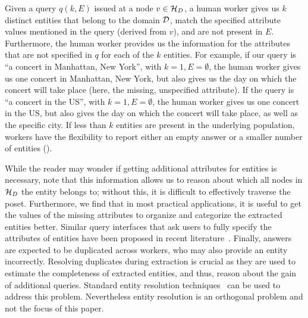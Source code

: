  Given a query $q(k, E)$ issued at a node $v \in \mathcal{H}_D$, a human worker gives us $k$ distinct entities that belong to the domain $\mathcal{D}$, match the specified attribute values mentioned in the query (derived from $v$), and are not present in $E$. Furthermore, the human worker provides us the information for the attributes that are not specified in $q$ for each of the $k$ entities. For example, if our query is ``a concert in Manhattan, New York'', with $k = 1, E = \emptyset$, the human worker gives us one concert in Manhattan, New York, but also gives us the day on which the concert will take place (here, the missing, unspecified attribute). If the query is ``a concert in the US'', with $k = 1, E = \emptyset$, the human worker gives us one concert in the US, but also gives the day on which the concert will take place, as well as the specific city. If less than $k$ entities are present in the underlying population, workers have the flexibility to report either an empty answer or a smaller number of entities ().

While the reader may wonder if getting additional attributes for entities is necessary, note that this information allows us to reason about which all nodes in $\mathcal{H}_D$ the entity belongs to; without this, it is difficult to effectively traverse the poset. Furthermore, we find that in most practical applications, it is useful to get the values of the missing attributes to organize and categorize the extracted entities better. Similar query interfaces that ask users to fully specify the attributes of entities have been proposed in recent literature~\cite{quinn:2014}. \ifpaper Finally, answers are expected to be duplicated across workers, who may also provide an entity incorrectly. Resolving duplicates during extraction is crucial as they are used to estimate the completeness of extracted entities, and thus, reason about the gain of additional queries. Standard entity resolution techniques~\cite{getoor:kdd13} can be used to address this problem. Nevertheless entity resolution is an orthogonal problem and not the focus of this paper. \fi

